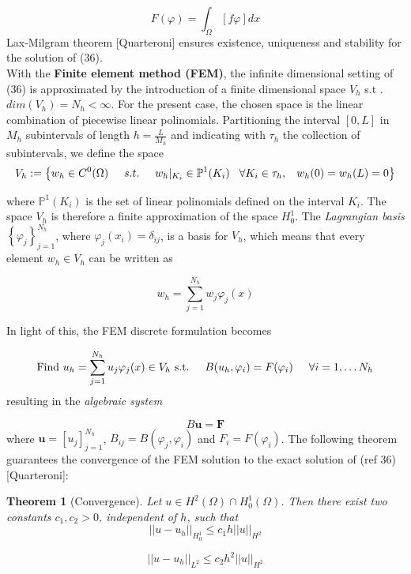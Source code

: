 \documentclass[a4paper]{article}
\newtheorem{theorem}{Theorem}[section]
\begin{document}
\begin{enumerate}
	\begin{equation}
F(\varphi) = \int_{\Omega} \left[f \varphi\right] dx
	\end{equation}
 Lax-Milgram theorem [Quarteroni] ensures existence, uniqueness and stability for the solution of (36).\\
 With the \textbf{Finite element method (FEM)}, the infinite dimensional setting of (36) is approximated by the introduction of a finite dimensional space $V_h$ s.t . $dim(V_h) = N_h < \infty$. For the present case, the chosen space is the linear combination of piecewise linear polinomials. Partitioning the interval $[0,L]$ in $M_h$ subintervals of length $ h = \frac{L}{M_h}$ and indicating with $\tau_h$ the collection of subintervals, we define the space
 $$ V_h := \left\{ w_h\in C^0(\Omega) \hspace{0.5 cm} s.t. \hspace{0.5 cm} w_h|_{K_i} \in \mathbb{P}^1(K_i) \hspace{0.3 cm} \forall K_i \in \tau_h, \hspace{0.3 cm} w_h(0)=w_h(L)=0 \right\}$$
 
 where $ \mathbb{P}^1(K_i)$ is the set of linear polinomials defined on the interval $K_i$. The space $V_h$ is therefore a finite approximation of the space $H_0^1$. The \textit{Lagrangian basis} $ \left\{ \varphi _j \right\}_{j=1}^{N_h}$, where $ \varphi_j(x_i) = \delta_{ij}$, is a basis for $V_h$, which means that every element $w_h \in V_h$ can be written as
 
\begin{equation}
 w_h = \sum_{j=1}^{N_h} w_j \varphi_j(x)
\end{equation}

In light of this, the FEM discrete formulation becomes

	\begin{equation}
\text{Find $u_h = \sum_{j=1}^{N_h} u_j \varphi_j(x) \in V_h$ s.t.} \hspace{0.5cm} B(u_h,\varphi_i) = F(\varphi_i) \hspace{0.5cm} \forall i = 1, \dots N_h
\end{equation}
resulting in the \textit{algebraic system}

\begin{equation}
B \textbf{u} = \textbf{F}
\end{equation}
where $\textbf{u} = [u_j]_{j=1}^{N_h}$, $B_{ij} = B(\varphi_j,\varphi_i)$ and $F_i = F(\varphi_i)$. The following theorem guarantees the convergence of the FEM solution to the exact solution of (ref 36) [Quarteroni]:
\begin{theorem}[Convergence]
	Let $u \in H^2(\Omega) \cap H_0^1(\Omega)$. Then there exist two constants $c_1,c_2 >0$, independent of $h$, such that
	$$||u-u_h||_{H_0^1} \le c_1h||u||_{H^2}$$
	
	$$||u-u_h||_{L^2} \le c_2h^2||u||_{H^2}$$
\end{theorem}
\end{enumerate}
\end{document}

